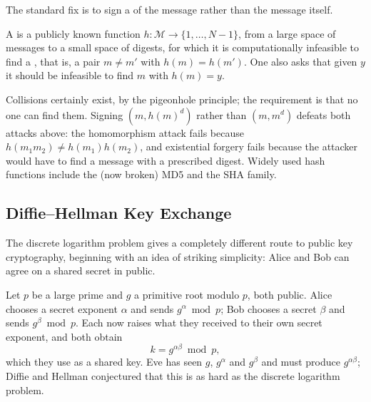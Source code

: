 \documentclass[a4paper]{scrartcl}
\newcommand{\Mc}{\mathcal{M}}
\begin{document}
The standard fix is to sign a  of the message rather than the message itself.

\begin{definition}
	A  is a publicly known function $h\colon\Mc\to\{1,\dots,N-1\}$, from a large space of messages to a small space of digests, for which it is computationally infeasible to find a , that is, a pair $m \ne m'$ with $h(m)=h(m')$. One also asks that given $y$ it should be infeasible to find $m$ with $h(m)=y$.
\end{definition}

Collisions certainly exist, by the pigeonhole principle; the requirement is that no one can find them. Signing $(m, h(m)^d)$ rather than $(m,m^d)$ defeats both attacks above: the homomorphism attack fails because $h(m_1m_2)\ne h(m_1)h(m_2)$, and existential forgery fails because the attacker would have to find a message with a prescribed digest. Widely used hash functions include the (now broken) MD5 and the SHA family.

\subsection{Diffie--Hellman Key Exchange}

The discrete logarithm problem gives a completely different route to public key cryptography, beginning with an idea of striking simplicity: Alice and Bob can agree on a shared secret in public.

\begin{example}
	Let $p$ be a large prime and $g$ a primitive root modulo $p$, both public. Alice chooses a secret exponent $\alpha$ and sends $g^\alpha \bmod p$; Bob chooses a secret $\beta$ and sends $g^\beta\bmod p$. Each now raises what they received to their own secret exponent, and both obtain
	$$k = g^{\alpha\beta}\bmod p,$$
	which they use as a shared key. Eve has seen $g$, $g^\alpha$ and $g^\beta$ and must produce $g^{\alpha\beta}$; Diffie and Hellman conjectured that this is as hard as the discrete logarithm problem.
\end{example}

\begin{center}
\end{center}
\end{document}
